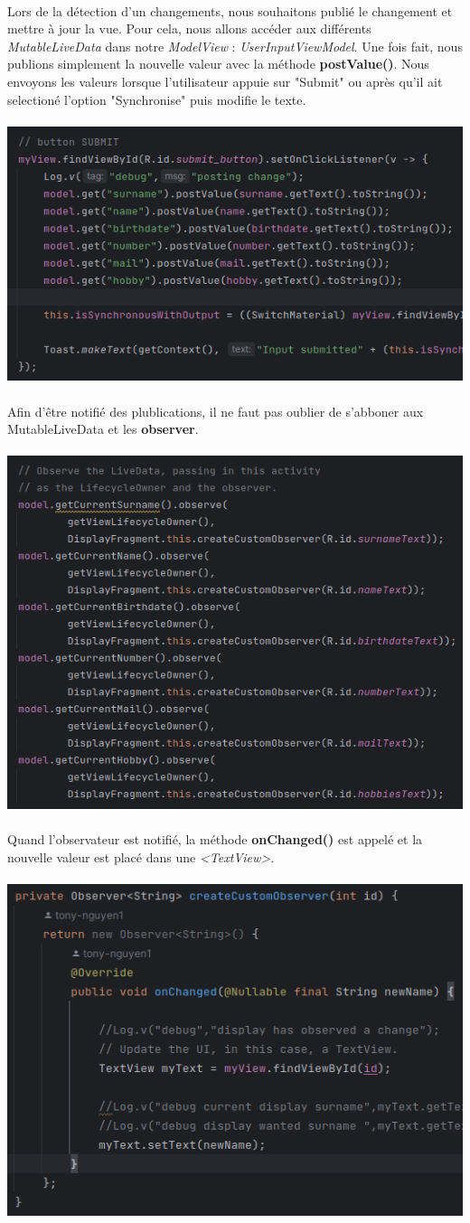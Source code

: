 \documentclass[a4paper]{article}
\begin{document}
\begin{multicols}{2}
                \paragraph{}
                    Lors de la détection d'un changements, nous souhaitons publié le changement et mettre à jour la vue. Pour cela, nous allons accéder aux différents \emph{MutableLiveData} dans notre \emph{ModelView} : \emph{UserInputViewModel}. Une fois fait, nous publions simplement la nouvelle valeur avec la méthode \textbf{postValue()}. Nous envoyons les valeurs lorsque l'utilisateur appuie sur "Submit" ou après qu'il ait selectioné l'option "Synchronise" puis modifie le texte.
                    \\\\
                    \noindent\includegraphics[width=.47\textwidth]{fragment/post}
                \paragraph{}
                    Afin d'être notifié des plublications, il ne faut pas oublier de s'abboner aux MutableLiveData et les \textbf{observer}.
                    \\\\
                    \noindent\includegraphics[width=.47\textwidth]{fragment/observe}
                \paragraph{}
                    Quand l'observateur est notifié, la méthode \textbf{onChanged()} est appelé et la nouvelle valeur est placé dans une \emph{<TextView>}.
                    \\\\
                    \noindent\includegraphics[width=.47\textwidth]{fragment/onChanged}

\end{multicols}
\end{document}
